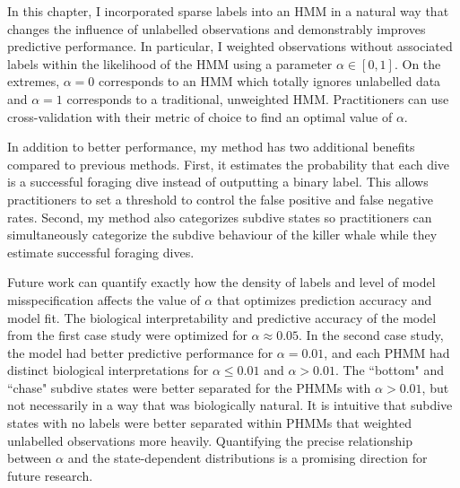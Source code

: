 

In this chapter, I incorporated sparse labels into an HMM in a natural way that changes the influence of unlabelled observations and demonstrably improves predictive performance. In particular, I weighted observations without associated labels within the likelihood of the HMM using a parameter $\alpha \in [0,1]$. On the extremes, $\alpha = 0$ corresponds to an HMM which totally ignores unlabelled data and $\alpha = 1$ corresponds to a traditional, unweighted HMM. Practitioners can use cross-validation with their metric of choice to find an optimal value of $\alpha$.

In addition to better performance, my method has two additional benefits compared to previous methods. First, it estimates the probability that each dive is a successful foraging dive instead of outputting a binary label. This allows practitioners to set a threshold to control the false positive and false negative rates. Second, my method also categorizes subdive states so practitioners can simultaneously categorize the subdive behaviour of the killer whale while they estimate successful foraging dives.

Future work can quantify exactly how the density of labels and level of model misspecification affects the value of $\alpha$ that optimizes prediction accuracy and model fit. The biological interpretability and predictive accuracy of the model from the first case study were optimized for $\alpha \approx 0.05$. In the second case study, the model had better predictive performance for $\alpha = 0.01$, and each PHMM had distinct biological interpretations for $\alpha \leq 0.01$ and $\alpha > 0.01$. The ``bottom" and ``chase" subdive states were better separated for the PHMMs with $\alpha > 0.01$, but not necessarily in a way that was biologically natural. It is intuitive that subdive states with no labels were better separated within PHMMs that weighted unlabelled observations more heavily. Quantifying the precise relationship between $\alpha$ and the state-dependent distributions is a promising direction for future research. 

